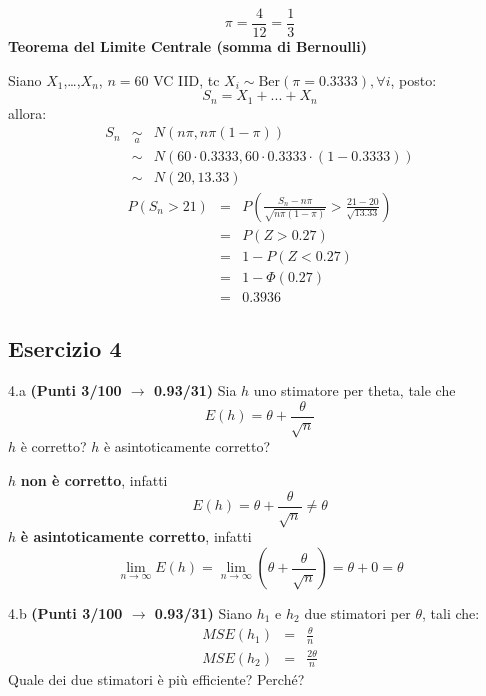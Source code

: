 \documentclass[
  11pt,
]{book}
\theoremstyle{mytheoremstyle}
\theoremstyle{mydefstyle}
\newenvironment{sol}
  {
  \begin{tcolorbox}[enhanced,breakable,arc=0.1mm,boxrule=1pt,colback=white,colframe=iblue,
  title=\bf \fontfamily{lmss}\selectfont \hspace{.5 cm} Soluzione,drop fuzzy shadow]

}{
\end{tcolorbox}
  }
\begin{document}
\begin{sol}
\[\pi=\frac 4{12}=\frac 13\]
\textbf{Teorema del Limite Centrale (somma di Bernoulli)}

Siano \(X_1\),\ldots,\(X_n\), \(n=60\) VC IID, tc \(X_i\sim\text{Ber}(\pi=0.3333)\)\(,\forall i\), posto:
\[
      S_n = X_1 + ... + X_n
      \]
allora:\begin{eqnarray*}
  S_n & \mathop{\sim}\limits_{a}& N(n\pi,n\pi(1-\pi)) \\
      &\sim & N(60\cdot0.3333,60\cdot0.3333\cdot(1-0.3333)) \\
      &\sim & N(20,13.33)
  \end{eqnarray*}\begin{eqnarray*}
      P( S_n   >   21 ) 
        &=& P\left(  \frac { S_n  -  n\pi }{ \sqrt{n\pi(1-\pi)} }  >  \frac { 21  -  20 }{\sqrt{ 13.33 }} \right)  \\
                 &=& P\left(  Z   >   0.27 \right) \\    &=& 1-P(Z< 0.27 )\\ 
                 &=&  1-\Phi( 0.27 ) \\ &=&  0.3936 
      \end{eqnarray*}

\end{sol}

\subsection{Esercizio 4}\label{esercizio-4-3}

4.a \textbf{(Punti 3/100 \(\rightarrow\) 0.93/31)} Sia \(h\) uno stimatore per theta, tale che
\[
E(h)=\theta+\frac\theta {\sqrt{ n}}
\]
\(h\) è corretto? \(h\) è asintoticamente corretto?

\begin{sol}
\(h\) \textbf{non è corretto}, infatti
\[
E(h)=\theta+\frac\theta {\sqrt{ n}}\neq\theta
\]
\(h\) \textbf{è asintoticamente corretto}, infatti
\[
\lim_{n\to\infty}E(h)=\lim_{n\to\infty}\left(\theta+\frac\theta {\sqrt{ n}}\right)=\theta+0=\theta
\]

\end{sol}

4.b \textbf{(Punti 3/100 \(\rightarrow\) 0.93/31)} Siano \(h_1\) e \(h_2\) due stimatori per \(\theta\), tali che:
\begin{eqnarray*}
MSE(h_1) &=&   \frac\theta n\\
MSE(h_2) &=&   \frac{2\theta} n
\end{eqnarray*}
Quale dei due stimatori è più efficiente? Perché?
\end{document}
